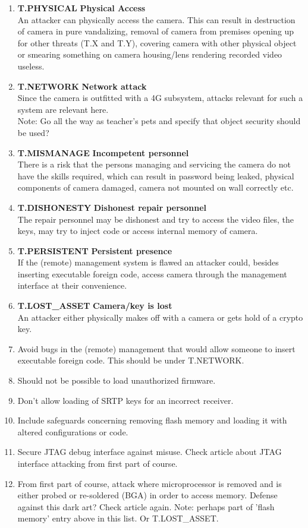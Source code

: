 \documentclass[10pt]{article}
\newcommand{\threat}[3]{\item{\textbf{T.#1} \hfill \textbf{#2} \\ #3}}
\begin{document}
  \begin{enumerate}
    \threat{PHYSICAL}{Physical Access} {
	An attacker can physically access the camera. This can result in destruction of camera in pure vandalizing, removal of camera from premises opening up for other threats (T.X and T.Y),
	covering camera with other physical object or smearing something on camera housing/lens rendering recorded video useless. }
    \threat{NETWORK}{Network attack} {
	Since the camera is outfitted with a 4G subsystem, attacks relevant for such a system are relevant here. \\
	Note: Go all the way as teacher's pets and specify that object security should be used?}
    \threat{MISMANAGE}{Incompetent personnel} {
	There is a risk that the persons managing and servicing the camera do not have the skills required, which can result in password being leaked, physical components of camera damaged, camera not mounted on wall correctly etc.}
    \threat{DISHONESTY}{Dishonest repair personnel}{ %
	The repair personnel may be dishonest and try to access the video files, the keys, may try to inject code or access internal memory of camera.}
    \threat{PERSISTENT}{Persistent presence}{
	If the (remote) management system is flawed an attacker could, besides inserting executable foreign code, access camera through the management interface at their convenience.}
    \threat{LOST\_ASSET}{Camera/key is lost}{An attacker either physically makes off with a camera or gets hold of a crypto key.}

    \item{Avoid bugs in the (remote) management that would allow someone to
      insert executable foreign code. This should be under T.NETWORK.}
    \item{Should not be possible to load unauthorized firmware.}
    \item{Don't allow loading of SRTP keys for an incorrect receiver.}
    \item{Include safeguards concerning removing flash memory and loading it
      with altered configurations or code.}
    \item{Secure JTAG debug interface against misuse. Check article about JTAG interface attacking from first part of course.}
    \item{From first part of course, attack where microprocessor is removed and is either probed or re-soldered (BGA) in order to access memory. Defense against this dark art? Check article again. Note: perhaps part of 'flash memory' entry above in this list. Or T.LOST\_ASSET.}
  \end{enumerate}
\end{document}
